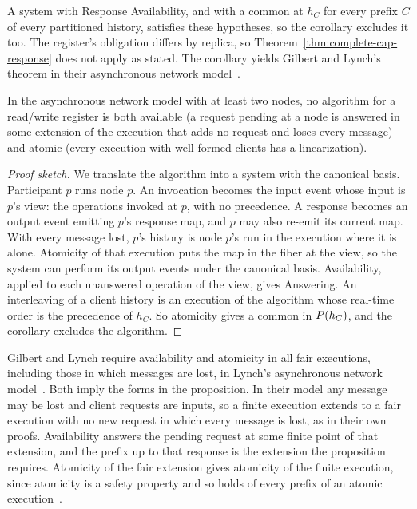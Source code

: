 A system with Response Availability, and with a common \outnoun at $h_C$ for
every prefix $C$ of every partitioned history, satisfies these hypotheses, so
the corollary excludes it too.  The register's obligation differs by replica, so
Theorem~\ref{thm:complete-cap-response} does not apply as stated.  The
corollary yields Gilbert and Lynch's theorem in their asynchronous network
model~\cite{gilbert2002cap}.

\begin{proposition}
\label{prop:gl-async}
In the asynchronous network model with at least two nodes, no algorithm for a
read/write register is both available (a request pending at a node is
answered in some extension of the execution that adds no request and loses
every message) and atomic (every execution with well-formed clients has a
linearization).
\end{proposition}

\begin{proof}[Proof sketch]
We translate the algorithm into a system with the canonical basis.  Participant
$p$ runs node $p$.  An invocation becomes the input event whose input is $p$'s
view: the operations invoked at $p$, with no precedence.  A response becomes an
output event emitting $p$'s response map, and $p$ may also re-emit its current
map.  With every message lost, $p$'s history is node $p$'s run in the
execution where it is alone.  Atomicity of that execution puts the map in the
fiber at the view, so the system can perform its output events under the
canonical basis.  Availability, applied to each unanswered operation of the
view, gives Answering.  An interleaving of a client history is an execution of
the algorithm whose real-time order is the precedence of $h_C$.  So atomicity
gives a common \outnoun in $P(h_C)$, and the corollary excludes the
algorithm.
\end{proof}

Gilbert and Lynch require availability and atomicity in all fair executions,
including those in which messages are lost, in Lynch's asynchronous network
model~\cite[Theorem~1]{gilbert2002cap}\cite[Chapter~8]{lynch1996distributed}.
Both imply the forms in the proposition.  In their model any message may be
lost and client requests are inputs, so a finite execution extends to a fair
execution with no new request in which every message is lost, as in their
own proofs.  Availability answers the pending request at some finite point of
that extension, and the prefix up to that response is the extension the
proposition requires.  Atomicity of the fair extension gives atomicity of the
finite execution, since atomicity is a safety property and so holds of every
prefix of an atomic execution~\cite[Chapter~13]{lynch1996distributed}.

